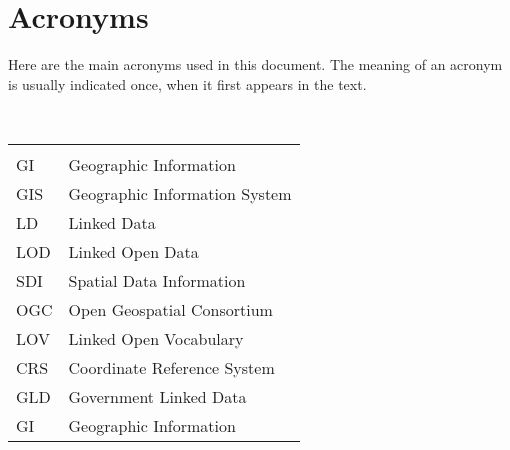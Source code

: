 

\chapter*{Acronyms}

Here are the main acronyms used in this document. The meaning of an acronym is usually indicated once, when it first appears in the text. 

 \\

\begin{longtable}{lp{11cm}}
  &\\
  GI &  Geographic Information\\
  GIS &  Geographic Information System\\
  LD  &  Linked Data\\
  LOD &  Linked Open Data\\ 
  SDI &  Spatial Data Information\\
  OGC & Open Geospatial Consortium\\
  LOV &  Linked Open Vocabulary\\
  CRS &  Coordinate Reference System\\
  GLD &  Government Linked Data\\
  GI  &  Geographic Information\\
  
 
\end{longtable}
